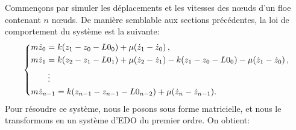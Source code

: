Commençons par simuler les déplacements et les vitesses des n\oe{}uds d'un floe contenant $n$ n\oe{}uds. De manière semblable aux sections précédentes, la loi de comportement du système est la suivante:
\begin{align} \label{eq:multiressortsdep}
    \begin{dcases}
        m\ddot z_0 = k(z_1 - z_0 - L0_0) + \mu (\dot z_1 - \dot z_0)\, , \\
        m\ddot z_1 =  k(z_2 - z_1 - L0_1) + \mu (\dot z_2 - \dot z_1) - k(z_1 - z_0 - L0_0) - \mu (\dot z_1 - \dot z_0) \,, \\
        \qquad \vdots \\
        m\ddot z_{n-1} = k(z_{n-1} - z_{n-1} - L0_{n-2}) + \mu (\dot z_{n} - \dot z_{n-1}). 
    \end{dcases}
\end{align}
Pour résoudre ce système, nous le posons sous forme matricielle, et nous le transformons en un système d'EDO du premier ordre. On obtient:

